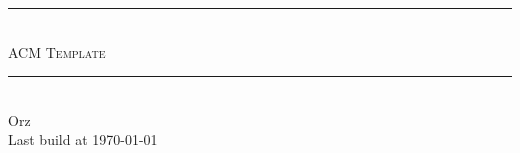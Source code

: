 \documentclass[10pt,a4paper ]{article}
\begin{document}
\begin{CJK}{UTF8}{gbsn}

    \begin{titlepage}
        \begin{center}
        \hrule\ \\[5pt]
        \Huge \textsc{ACM Template}\\[8pt]
        \hrule\ \\[300pt]

        \huge Orz\\[8pt]
        \Large Last build at \today \\[210pt]
        \end{center}
    \end{titlepage}


    \tableofcontents
    \clearpage

    
    \clearpage

    
    \clearpage

    
    \clearpage

    
    \clearpage

    
    \clearpage

    
    \clearpage

    
    \clearpage

    
    \clearpage
    
    
    \clearpage

\end{CJK}
\end{document}
